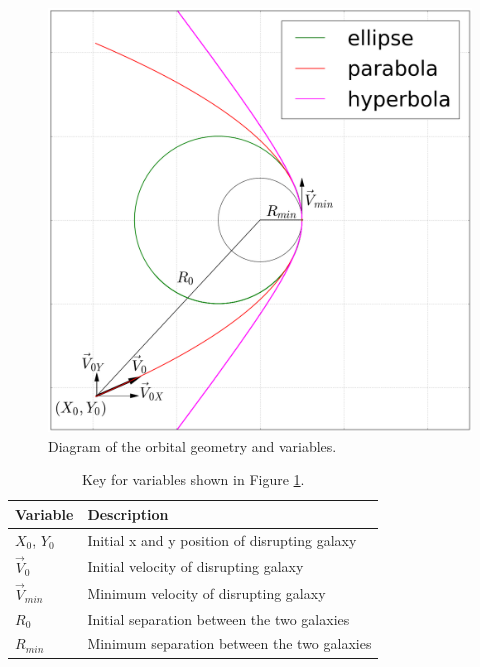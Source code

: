 \documentclass[11pt]{article}
\begin{document}
\begin{figure}[h!]
\centering
\includegraphics[width=5in]{Figure_A_1.png}
\caption{Diagram of the orbital geometry and variables.}
\label{geometry_fig}
\end{figure}

\begin{table}[h!]
\centering
\caption{Key for variables shown in Figure \ref{geometry_fig}.}
\begin{tabular}{l p{8cm}}
Variable & Description \\
\hline	%
$X_0$, $Y_0$ & Initial x and y position of disrupting galaxy \\
$\vec{V}_0$ & Initial velocity of disrupting galaxy \\
$\vec{V}_{min}$ & Minimum velocity of disrupting galaxy \\
$R_0$ & Initial separation between the two galaxies \\
$R_{min}$ & Minimum separation between the two galaxies \\
\end{tabular}
\label{table1}
\end{table}
\end{document}
